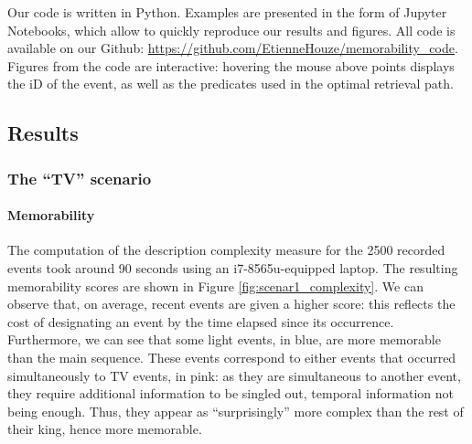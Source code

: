 \documentclass[entropy,article,submit,moreauthors,pdftex]{Definitions/mdpi}
\begin{document}
Our code is written in Python. Examples are presented in the form of Jupyter Notebooks, which allow to quickly reproduce our results and figures. All code is available on our Github: \url{https://github.com/EtienneHouze/memorability_code}. Figures from the code are interactive: hovering the mouse above points displays the iD of the event, as well as the predicates used in the optimal retrieval path.


\subsection{Results}
\label{sec:example}



\subsubsection{The ``TV'' scenario}
\paragraph{Memorability}

The computation of the description complexity measure for the 2500 recorded events took around 90 seconds using an i7-8565u-equipped laptop. The resulting memorability scores are shown in Figure \ref{fig:scenar1_complexity}. We can observe that, on average, recent events are given a higher score: this reflects the cost of designating an event by the time elapsed since its occurrence. Furthermore, we can see that some light events, in blue, are more memorable than the main sequence. These events correspond to either events that occurred simultaneously to TV events, in pink: as they are simultaneous to another event, they require additional information to be singled out, temporal information not being enough. Thus, they appear as ``surprisingly'' more complex than the rest of their king, hence more memorable. 
\end{document}
